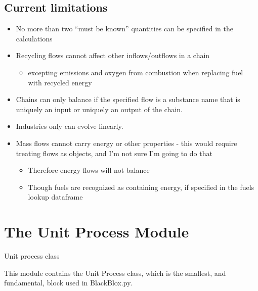 \documentclass[a4paper,10pt,english]{sphinxmanual}
\begin{document}
\subsection{Current limitations}
\label{\detokenize{intro:current-limitations}}\begin{itemize}
\item {} 
No more than two “must be known” quantities can be specified in the calculations

\item {} 
Recycling flows cannot affect other inflows/outflows in a chain
\begin{itemize}
\item {} 
excepting emissions and oxygen from combustion when replacing fuel with recycled energy

\end{itemize}

\item {} 
Chains can only balance if the specified flow is a substance name that is uniquely an input or uniquely an output of the chain.

\item {} 
Industries only can evolve linearly.

\item {} 
Mass flows cannot carry energy or other properties - this would require treating flows as objects, and I’m not sure I’m going to do that
\begin{itemize}
\item {} 
Therefore energy flows will not balance

\item {} 
Though fuels are recognized as containing energy, if specified in the fuels lookup dataframe

\end{itemize}

\end{itemize}


\section{The Unit Process Module}
\label{\detokenize{unit:module-unitprocess}}\label{\detokenize{unit:the-unit-process-module}}\label{\detokenize{unit::doc}}
Unit process class

This module contains the Unit Process class, which is the smallest,
and fundamental, block used in BlackBlox.py.
\end{document}
